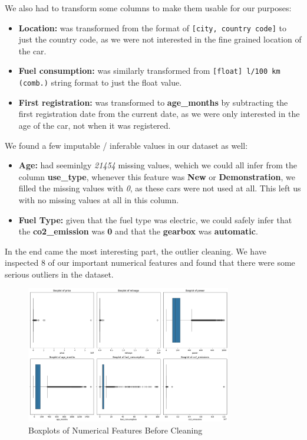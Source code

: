 \documentclass[12pt]{article}
\begin{document}
We also had to transform some columns to make them usable for our purposes:

\begin{itemize}
  \item \textbf{Location:} was transformed from the format of \texttt{[city, country code]} to just the country code, as we were not interested in the fine grained location of the car.
  \item \textbf{Fuel consumption:} was similarly transformed from \texttt{[float] l/100 km (comb.)} string format to just the float value.
  \item \textbf{First registration:} was transformed to \textbf{age\_months} by subtracting the first registration date from the current date, as we were only interested in the age of the car, not when it was registered.
\end{itemize}

We found a few imputable / inferable values in our dataset as well:

\begin{itemize}
  \item \textbf{Age:} had seeminlgy \textit{21454} missing values, wehich we could all infer from the column \textbf{use\_type}, whenever this feature was \textbf{New} or \textbf{Demonstration}, we filled the missing values with \textit{0}, as these cars were not used at all. This left us with no missing values at all in this column.
  \item \textbf{Fuel Type:} given that the fuel type was electric, we could safely infer that the \textbf{co2\_emission} was \textbf{0} and that the \textbf{gearbox} was \textbf{automatic}.
\end{itemize}

In the end came the most interesting part, the outlier cleaning. We have inspected 8 of our important numerical features and found that there were some serious outliers in the dataset.

\begin{figure}[ht]
  \centering
  \includegraphics[width=0.8\textwidth]{./images/boxplots_before.png}
  \caption{Boxplots of Numerical Features Before Cleaning}
  \label{fig:boxplots_before}
\end{figure}
\end{document}

